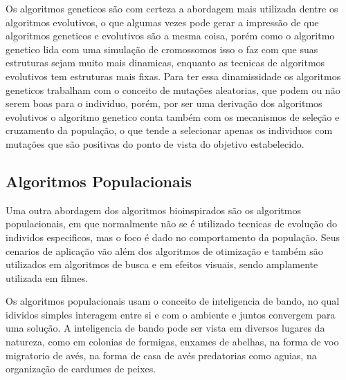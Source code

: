         Os algoritmos geneticos são com certeza a abordagem mais utilizada dentre os algoritmos evolutivos, o que algumas vezes pode gerar a impressão de que algoritmos geneticos e evolutivos são a mesma coisa, porém como o algoritmo genetico lida com uma simulação de cromossomos isso o faz com que suas estruturas sejam muito mais dinamicas, enquanto as tecnicas de algoritmos evolutivos tem estruturas mais fixas.\newline
        Para ter essa dinamissidade os algoritmos geneticos trabalham com o conceito de mutações aleatorias, que podem ou não serem boas para o individuo, porém, por ser uma derivação dos algoritmos evolutivos o algoritmo genetico conta também com os mecanismos de seleção e cruzamento da população, o que tende a selecionar apenas os individuos com mutações que são positivas do ponto de vista do objetivo estabelecido.


    \subsection{Algoritmos Populacionais}
        Uma outra abordagem dos algoritmos bioinspirados são os algoritmos populacionais, em que normalmente não se é utilizado tecnicas de evolução do individos especificos, mas o foco é dado no comportamento da população.\newline
        Seus cenarios de aplicação vão além dos algoritmos de otimização e também são utilizados em algoritmos de busca e em efeitos visuais, sendo amplamente utilizada em filmes. \newline
        
        Os algoritmos populacionais usam o conceito de inteligencia de bando, no qual idividos simples interagem entre si e com o ambiente e juntos convergem para uma solução.\newline
        A inteligencia de bando pode ser vista em diversos lugares da natureza, como em colonias de formigas, enxames de abelhas, na forma de voo migratorio de avés, na forma de casa de avés predatorias como aguias, na organização de cardumes de peixes.\newline

